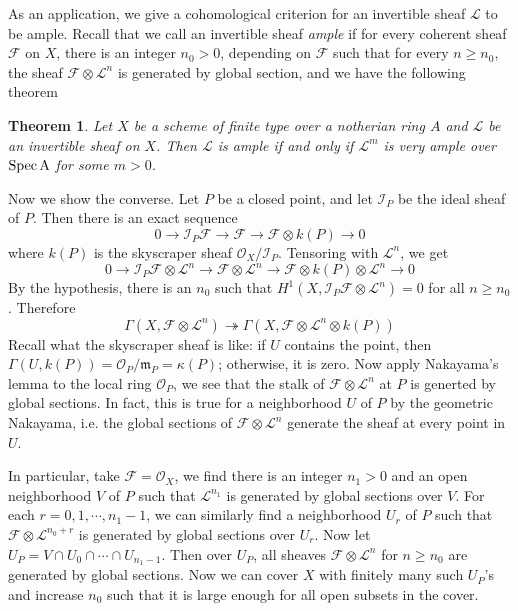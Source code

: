 \documentclass[12pt]{article}
\theoremstyle{plain}
\newtheorem{theorem}[equation]{Theorem}
\theoremstyle{definition}
\newcommand{\fm}{\mathfrak{m}}
\newcommand{\sO}{\mathcal{O}}
\newcommand{\shF}{\mathscr{F}}
\newcommand{\shI}{\mathscr{I}}
\newcommand{\shL}{\mathscr{L}}
\newcommand{\Spec}{\rm Spec\,}
\newcommand\tensor{{\otimes}}
\newcommand{\<}{\langle}
\renewcommand{\>}{\rangle}
\newcommand{\onto}{\twoheadrightarrow}
\begin{document}
As an application, we give a cohomological criterion for an invertible sheaf $\shL$ to be ample. Recall that we call an invertible sheaf \textit{ample} if for every coherent sheaf $\shF$ on $X$, there is an integer $n_0 > 0$, depending on $\shF$ such that for every $n \ge n_0$, the sheaf $\shF \tensor \shL^n$ is generated by global section, and we have the following theorem 
\begin{theorem}
Let $X$ be a scheme of finite type over a notherian ring $A$ and $\shL$ be an invertible sheaf on $X$. Then $\shL$ is ample if and only if $\shL^m$ is very ample over $\Spec A$ for some $m > 0$. 
\end{theorem}

Now we show the converse. Let $P$ be a closed point, and let $\shI_P$ be the ideal sheaf of $P$. Then there is an exact sequence
$$ 0 \to \shI_P \shF \to \shF \to \shF \tensor k(P) \to 0 $$
where $k(P)$ is the skyscraper sheaf $\sO_X/\shI_P$. Tensoring with $\shL^n$, we get 
$$ 0 \to \shI_P \shF \tensor \shL^n \to \shF \tensor \shL^n \to \shF \tensor k(P) \tensor \shL^n \to 0 $$
By the hypothesis, there is an $n_0$ such that $H^1(X, \shI_P \shF \tensor \shL^n) = 0$ for all $n \ge n_0$. Therefore 
$$ \Gamma(X, \shF \tensor \shL^n) \onto \Gamma(X, \shF \tensor \shL^n \tensor k(P)) $$
Recall what the skyscraper sheaf is like: if $U$ contains the point, then $\Gamma(U, k(P)) = \sO_P/\fm_P = \kappa(P)$; otherwise, it is zero. Now apply Nakayama's lemma to the local ring $\sO_P$, we see that the stalk of $\shF \tensor \shL^n$ at $P$ is generted by global sections. In fact, this is true for a neighborhood $U$ of $P$ by the geometric Nakayama, i.e. the global sections of $\shF \tensor \shL^n $ generate the sheaf at every point in $U$. 

In particular, take $\shF = \sO_X$, we find there is an integer $n_1 > 0$ and an open neighborhood $V$ of $P$ such that $\shL^{n_1}$ is generated by global sections over $V$. For each $r = 0, 1, \cdots, n_1 - 1$, we can similarly find a neighborhood $U_r$ of $P$ such that $\shF \tensor \shL^{n_0 + r}$ is generated by global sections over $U_r$. Now let $U_P = V \cap U_0 \cap \cdots \cap U_{n_1 - 1}$. Then over $U_P$, all sheaves $\shF \tensor \shL^n$ for $n \ge n_0$ are generated by global sections. Now we can cover $X$ with finitely many such $U_P$'s and increase $n_0$ such that it is large enough for all open subsets in the cover.  
\end{document}

